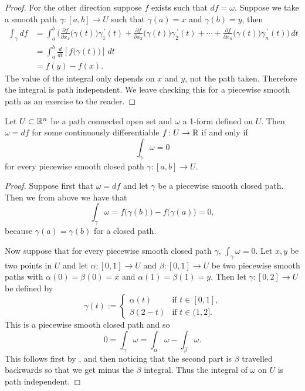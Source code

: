 \begin{proof}
For the other direction
suppose $f$ exists such that $df = \omega$.  Suppose we take a smooth
path
$\gamma \colon [a,b] \to U$ such that $\gamma(a) = x$ and
$\gamma(b) = y$, then
\begin{equation*}
\begin{split}
\int_\gamma df
& =
\int_a^b
\biggl(
\frac{\partial f}{\partial x_1}\bigl(\gamma(t)\bigr) \gamma_1^{\:\prime}(t)+
\frac{\partial f}{\partial x_2}\bigl(\gamma(t)\bigr) \gamma_2^{\:\prime}(t)+ \cdots +
\frac{\partial f}{\partial x_n}\bigl(\gamma(t)\bigr) \gamma_n^{\:\prime}(t)
\biggr) \, dt
\\
& = 
\int_a^b
\frac{d}{dt} \left[ f\bigl(\gamma(t)\bigr) \right]\, dt
\\
& = f(y)-f(x) .
\end{split}
\end{equation*}
The value of the integral only depends on $x$ and $y$, not the
path taken.  Therefore the integral is path independent.
We leave checking this for a piecewise smooth path as an exercise to the reader.
\end{proof}

\begin{prop}
Let $U \subset {\mathbb{R}}^n$ be a path connected open set and $\omega$
a 1-form defined on $U$.
Then $\omega = df$ for some continuously differentiable $f \colon U \to
{\mathbb{R}}$ if and only if
\begin{equation*}
\int_{\gamma} \omega = 0
\end{equation*}
for every piecewise smooth closed path $\gamma \colon [a,b] \to U$.
\end{prop}

\begin{proof}
Suppose first that $\omega = df$ and let $\gamma$ be a piecewise smooth
closed path.  Then we
from above we have that
\begin{equation*}
\int_{\gamma} \omega = f\bigl(\gamma(b)\bigr) - f\bigl(\gamma(a)\bigr) = 0 ,
\end{equation*}
because $\gamma(a) = \gamma(b)$ for a closed path.

Now suppose that for every piecewise smooth closed path $\gamma$, $\int_{\gamma} \omega = 0$.
Let $x,y$ be two points in $U$ and let $\alpha \colon [0,1] \to U$ and
$\beta \colon [0,1] \to U$ be two piecewise smooth paths with $\alpha(0) = \beta(0) = x$
and $\alpha(1) = \beta(1) = y$.  Then let $\gamma \colon [0,2] \to U$
be defined by
\begin{equation*}
\gamma(t) :=
\begin{cases}
\alpha(t) & \text{if $t \in [0,1]$,} \\
\beta(2-t) & \text{if $t \in (1,2]$.}
\end{cases}
\end{equation*}
This is a piecewise smooth closed path and so 
\begin{equation*}
0 = \int_{\gamma} \omega = \int_{\alpha} \omega - \int_{\beta} \omega .
\end{equation*}
This follows first by , and then noticing that
the second part is $\beta$ travelled backwards so that we get minus the
$\beta$ integral.  Thus the integral of $\omega$ on $U$ is path independent.
\end{proof}


